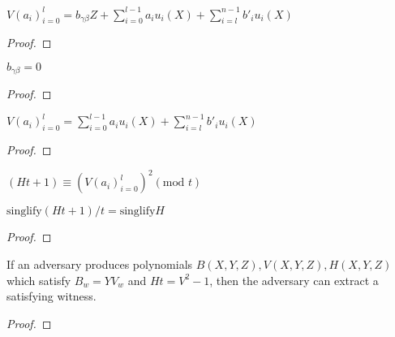 \begin{lemma} \label{lem:V_eval}
\leanok
$V (a_i)_{i = 0}^{l} = b_{\gamma \beta} Z + \sum_{i = 0}^{l - 1} a_i u_i(X) + \sum_{i = l}^{n - 1} b'_i u_i(X) $
\end{lemma}
\begin{proof}
\leanok
\end{proof}

\begin{lemma} \label{lem:b_gb_zero}
\leanok
$b_{\gamma \beta} = 0$
\end{lemma}
\begin{proof}
\leanok
{}
\end{proof}

\begin{lemma} \label{lem:V_eval2}
\leanok
$V (a_i)_{i = 0}^{l} = \sum_{i = 0}^{l - 1} a_i u_i(X) + \sum_{i = l}^{n - 1} b'_i u_i(X) $
\end{lemma}
\begin{proof}
\leanok
{}
\end{proof}

\begin{lemma} \label{lem:Ht_mod_t}
\leanok
{}
$ (Ht + 1) \equiv (V (a_i)_{i = 0}^{l})^2 (\text{mod }t) $
\end{lemma}

\begin{lemma} \label{lem:singlify_Ht}
$\textrm{singlify} (Ht + 1)/t = \textrm{singlify} H$
\end{lemma}
\begin{proof}
\end{proof}

\begin{theorem}\label{lem:knowledge_soundness}
\leanok
If an adversary produces polynomials $B(X,Y,Z), V(X,Y,Z), H(X,Y,Z)$ which satisfy $B_w = Y V_w$ and $H t = V^2 -1$, then the adversary can extract a satisfying witness.
\end{theorem}
\begin{proof}
\end{proof}